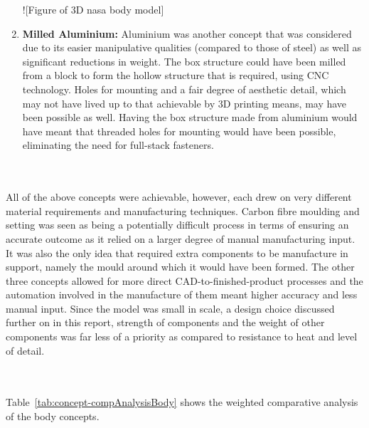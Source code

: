 \begin{enumerate}
        ![Figure of 3D nasa body model]
        
        \item \textbf{Milled Aluminium:} Aluminium was another concept that was considered due to its easier manipulative qualities (compared to those of steel) as well as significant reductions in weight. The box structure could have been milled from a block to form the hollow structure that is required, using CNC technology. Holes for mounting and a fair degree of aesthetic detail, which may not have lived up to that achievable by 3D printing means, may have been possible as well. Having the box structure made from aluminium would have meant that threaded holes for mounting would have been possible, eliminating the need for full-stack fasteners.
      \end{enumerate}
      
      \\\\
      All of the above concepts were achievable, however, each drew on very different material requirements and manufacturing techniques. Carbon fibre moulding and setting was seen as being a potentially difficult process in terms of ensuring an accurate outcome as it relied on a larger degree of manual manufacturing input. It was also the only idea that required extra components to be manufacture in support, namely the mould around which it would have been formed. The other three concepts allowed for more direct CAD-to-finished-product processes and the automation involved in the manufacture of them meant higher accuracy and less manual input. Since the model was small in scale, a design choice discussed further on in this report, strength of components and the weight of other components was far less of a priority as compared to resistance to heat and level of detail.
      
      \\\\
      Table~\ref{tab:concept-compAnalysisBody} shows the weighted comparative analysis of the body concepts.
      
